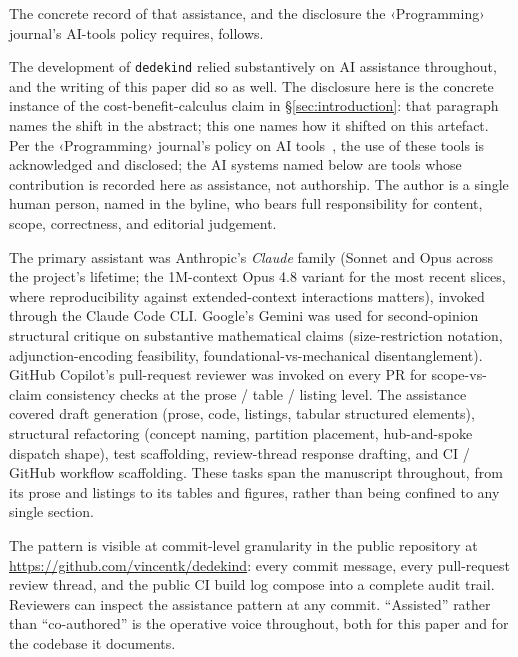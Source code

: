 \documentclass[11pt, a4paper]{article}
\begin{document}
The concrete record of that assistance, and the disclosure the ‹Programming› journal's AI-tools policy requires, follows.

The development of \texttt{dedekind} relied substantively on AI assistance throughout, and the writing of this paper did so as well.
The disclosure here is the concrete instance of the cost-benefit-calculus claim in §\ref{sec:introduction}: that paragraph names the shift in the abstract; this one names how it shifted on this artefact.
Per the ‹Programming› journal's policy on AI tools~\cite{programming_journal_ai_policy}, the use of these tools is acknowledged and disclosed; the AI systems named below are tools whose contribution is recorded here as assistance, not authorship.
The author is a single human person, named in the byline, who bears full responsibility for content, scope, correctness, and editorial judgement.

The primary assistant was Anthropic's \emph{Claude} family (Sonnet and Opus across the project's lifetime; the 1M-context Opus 4.8 variant for the most recent slices, where reproducibility against extended-context interactions matters), invoked through the Claude Code CLI.
Google's Gemini was used for second-opinion structural critique on substantive mathematical claims (size-restriction notation, adjunction-encoding feasibility, foundational-vs-mechanical disentanglement).
GitHub Copilot's pull-request reviewer was invoked on every PR for scope-vs-claim consistency checks at the prose / table / listing level.
The assistance covered draft generation (prose, code, listings, tabular structured elements), structural refactoring (concept naming, partition placement, hub-and-spoke dispatch shape), test scaffolding, review-thread response drafting, and CI / GitHub workflow scaffolding.
These tasks span the manuscript throughout, from its prose and listings to its tables and figures, rather than being confined to any single section.

The pattern is visible at commit-level granularity in the public repository at \url{https://github.com/vincentk/dedekind}: every commit message, every pull-request review thread, and the public CI build log compose into a complete audit trail.
Reviewers can inspect the assistance pattern at any commit.
``Assisted'' rather than ``co-authored'' is the operative voice throughout, both for this paper and for the codebase it documents.
\end{document}
